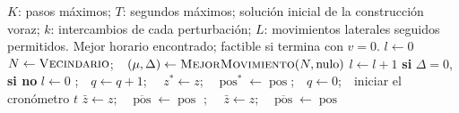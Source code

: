 \documentclass{article}
\begin{document}
\begin{algorithm}[H]
\caption{$\textsc{ILS}(K, T)$ --- búsqueda local iterada}
\label{alg:ils}
\begin{algorithmic}[1]
\Require $K$: pasos máximos; $T$: segundos máximos; solución inicial de la construcción voraz;
         $k$: intercambios de cada perturbación; $L$: movimientos laterales seguidos permitidos.
\Ensure Mejor horario encontrado; factible si termina con $v = 0$.
 
    \State $l \gets 0$
        \State $N \gets \Call{Vecindario}{}$;\ \ $(\mu, \Delta) \gets \Call{MejorMovimiento}{N, \text{nulo}}$ 
            \State \Return {}
        \EndIf
        \State $l \gets l + 1$ \textbf{si} $\Delta = 0$, \textbf{si no} $l \gets 0$ 
        \State {};\ \ $q \gets q + 1$;\ \ 
    \EndWhile
\EndProcedure
\Statex
\State $z^* \gets z$;\ \ $\operatorname{pos}^* \gets \operatorname{pos}$;\ \ $q \gets 0$;\ \ iniciar el cronómetro $t$
\State {} 
\State $\bar z \gets z$;\ \ $\overline{\operatorname{pos}} \gets \operatorname{pos}$ 
    \State {};\ \  
    \State {} 
     
        \State $\bar z \gets z$;\ \ $\overline{\operatorname{pos}} \gets \operatorname{pos}$
        \State {} 
    \EndIf
\EndWhile
{}
    \State {} 
\EndIf
\end{algorithmic}
\end{algorithm}
\end{document}
